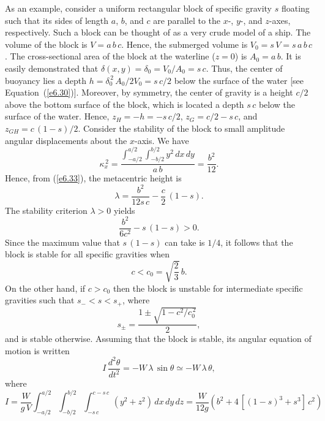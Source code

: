As an example, consider a  uniform rectangular block of specific gravity $s$ floating such that its sides
of length $a$, $b$, and $c$ are parallel to the $x$-, $y$-, and $z$-axes, respectively. Such a block can be
thought of as a very crude model of a ship. 
 The volume of the
block is $V=a\,b\,c$. Hence, the submerged volume is $V_0=s\,V = s\,a\,b\,c$. The cross-sectional
area of the block at the waterline ($z=0$) is $A_0=a\,b$. 
It is easily demonstrated that $\delta(x,y)=\delta_0=V_0/A_0=s\,c$.  Thus, the center of buoyancy lies a depth $h=\delta_0^{\,2}\,A_0/2V_0=s\,c/2$ below
the surface of the water [see Equation~(\ref{e6.30})]. Moreover, by symmetry, the center of gravity is a height $c/2$ above the bottom surface of the block, which is located 
a depth $s\,c$ below the surface of the water. Hence, $z_H = -h=-s\,c/2$, $z_G= c/2-s\,c$, and $z_{GH} = c\,(1-s)/2$. Consider the
stability of the block to small amplitude angular displacements about the $x$-axis. We have
\begin{equation}
\kappa_x^{\,2} = \frac{\int_{-a/2}^{a/2}\int_{-b/2}^{b/2} y^2\,dx\,dy}{a\,b} = \frac{b^2}{12}.
\end{equation}
Hence, from (\ref{e6.33}), the metacentric height is
\begin{equation}
\lambda = \frac{b^2}{12s\,c} - \frac{c}{2}\,(1-s).
\end{equation}
The stability criterion $\lambda>0$ yields
\begin{equation}
\frac{b^2}{6 c^2} - s\,(1-s)> 0.
\end{equation}
Since the maximum value that $s\,(1-s)$ can take is $1/4$, it follows that the block is stable for all
specific gravities when
\begin{equation}
c < c_0 = \sqrt{\frac{2}{3}}\,b.
\end{equation}
On the other hand, if $c>c_0$ then the block is unstable for intermediate specific gravities such that $s_-< s< s_+$, where
\begin{equation}
s_\pm = \frac{1\pm \sqrt{1-c^2/c_0^{\,2}}}{2},
\end{equation}
 and is stable otherwise. 
Assuming that the block is stable, its angular equation of motion is written
\begin{equation}
I\,\frac{d^2\theta}{dt^2} = - W\,\lambda\,\sin\theta\simeq - W\,\lambda\,\theta,
\end{equation}
where 
\begin{equation}
I = \frac{W}{g\,V}\int_{-a/2}^{a/2}\int_{-b/2}^{b/2}\int_{-s\,c}^{c-s\,c}\,(y^2+z^2)\,dx\,dy\,dz= \frac{W}{12g}\left(b^2+ 4\,[(1-s)^3+s^3]\,c^2\right)
\end{equation}
